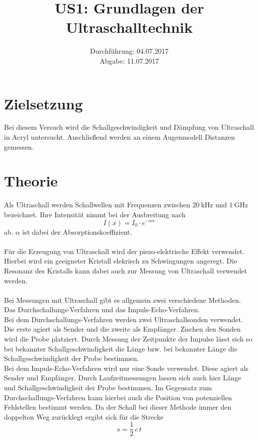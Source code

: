 \documentclass[
  bibliography=totoc,     %
  captions=tableheading,  %
  titlepage=firstiscover, %
]{scrartcl}
\title{US1: Grundlagen der Ultraschalltechnik}
\author{
  Simon Schulte
  \texorpdfstring{
    \\
    \href{mailto:simon.schulte@udo.edu}{simon.schulte@udo.edu}
  }{}
  \texorpdfstring{\and}{, }
  Tim Sedlaczek
  \texorpdfstring{
    \\
    \href{mailto:tim.sedlaczek@udo.edu}{tim.sedlaczek@udo.edu}
  }{}
}
\date{Durchführung: 04.07.2017\\
      Abgabe: 11.07.2017}
\begin{document}
\maketitle
\thispagestyle{empty}
\tableofcontents
\newpage
\setcounter{page}{1}
\section{Zielsetzung}
\label{sec:zielsetzung}
Bei diesem Versuch wird die Schallgeschwindigkeit und Dämpfung von Ultraschall
in Acryl untersucht. Anschließend werden an einem Augenmodell Distanzen gemessen.
\section{Theorie}
\label{sec:theorie}
Als Ultraschall werden Schallwellen mit Frequenzen zwischen $\SI{20}{\kilo\hertz}$
und $\SI{1}{\giga\hertz}$ bezeichnet.
Ihre Intensität nimmt bei der Ausbreitung nach
\begin{equation}
  I \left( x \right) = I_0 \cdot e^{-\alpha x}
  \label{eqn:dämpfung}
\end{equation}
ab. $\alpha$ ist dabei der Absorptionskoeffizient.\\
\\
\noindent
Für die Erzeugung von Ultraschall wird der piezo-elektrische Effekt verwendet.
Hierbei wird ein geeigneter Kristall elekrisch zu Schwingungen angeregt.
Die Resonanz des Kristalls kann dabei auch zur Messung von Ultraschall verwendet
werden.\\
\\
\noindent
Bei Messungen mit Ultraschall gibt es allgemein zwei verschiedene Methoden.
Das Durchschallungs-Verfahren und das Impuls-Echo-Verfahren.\\
Bei dem Durchschallungs-Verfahren werden zwei Ultraschallsonden verwendet.
Die erste agiert als Sender und die zweite als Empfänger. Zischen den
Sonden wird die Probe platziert. Durch Messung der Zeitpunkte der Impulse
lässt sich so bei bekannter Schallgeschwindigkeit die Länge bzw. bei bekannter
Länge die Schallgeschwindigkeit der Probe bestimmen.\\
Bei dem Impuls-Echo-Verfahren wird nur eine Sonde verwendet. Diese agiert
als Sender und Empfänger. Durch Laufzeitmessungen lassen sich auch hier
Länge und Schallgeschwindigkeit der Probe bestimmen. Im Gegensatz zum
Durchschallungs-Verfahren kann hierbei auch die Position von potenziellen
Fehlstellen bestimmt werden.
Da der Schall bei dieser Methode immer den doppelten Weg zurücklegt ergibt sich
für die Strecke
\begin{equation}
  s = \frac{1}{2}\,c\,t
  \label{eqn:strecke}
\end{equation}
\clearpage
\end{document}
